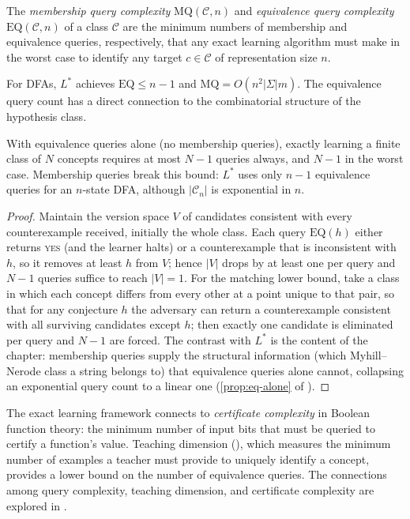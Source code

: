 \begin{defn}
\label{def:query-complexity}
The \emph{membership query complexity} $\mathrm{MQ}(\mathcal{C}, n)$ and \emph{equivalence query complexity} $\mathrm{EQ}(\mathcal{C}, n)$ of a class $\mathcal{C}$ are the minimum numbers of membership and equivalence queries, respectively, that any exact learning algorithm must make in the worst case to identify any target $c \in \mathcal{C}$ of representation size $n$.
\end{defn}

For DFAs, $L^*$ achieves $\mathrm{EQ} \leq n - 1$ and $\mathrm{MQ} = O(n^2 |\Sigma| m)$. The equivalence query count has a direct connection to the combinatorial structure of the hypothesis class.

\begin{prop}
\label{prop:eq-lower}
With equivalence queries alone (no membership queries), exactly learning a finite class of $N$ concepts requires at most $N - 1$ queries always, and $N - 1$ in the worst case. Membership queries break this bound: $L^*$ uses only $n - 1$ equivalence queries for an $n$-state DFA, although $|\mathcal{C}_n|$ is exponential in $n$.
\end{prop}

\begin{proof}
Maintain the version space $V$ of candidates consistent with every counterexample received, initially the whole class.  Each query $\mathrm{EQ}(h)$ either returns \textsc{yes} (and the learner halts) or a counterexample that is inconsistent with $h$, so it removes at least $h$ from $V$; hence $|V|$ drops by at least one per query and $N - 1$ queries suffice to reach $|V| = 1$.  For the matching lower bound, take a class in which each concept differs from every other at a point unique to that pair, so that for any conjecture $h$ the adversary can return a counterexample consistent with all surviving candidates except $h$; then exactly one candidate is eliminated per query and $N - 1$ are forced.  The contrast with $L^*$ is the content of the chapter: membership queries supply the structural information (which Myhill--Nerode class a string belongs to) that equivalence queries alone cannot, collapsing an exponential query count to a linear one (\cref{prop:eq-alone} of ).
\end{proof}

\begin{remark}
\label{rmk:certificate}
The exact learning framework connects to \emph{certificate complexity} in Boolean function theory: the minimum number of input bits that must be queried to certify a function's value. Teaching dimension (), which measures the minimum number of examples a teacher must provide to uniquely identify a concept, provides a lower bound on the number of equivalence queries. The connections among query complexity, teaching dimension, and certificate complexity are explored in .
\end{remark}

